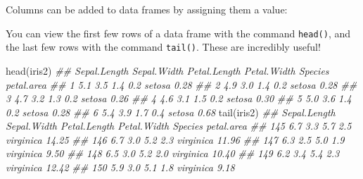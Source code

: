 \documentclass[
  13,
  letterpaper,
]{report}
\newenvironment{Shaded}{\begin{snugshade}}{\end{snugshade}}
\newcommand{\CommentTok}[1]{\textcolor[rgb]{0.37,0.37,0.37}{#1}}
\newcommand{\DocumentationTok}[1]{\textcolor[rgb]{0.37,0.37,0.37}{\textit{#1}}}
\newcommand{\FunctionTok}[1]{\textcolor[rgb]{0.28,0.35,0.67}{#1}}
\newcommand{\NormalTok}[1]{\textcolor[rgb]{0.00,0.23,0.31}{#1}}
\newcommand{\OtherTok}[1]{\textcolor[rgb]{0.00,0.23,0.31}{#1}}
\newcommand{\SpecialCharTok}[1]{\textcolor[rgb]{0.37,0.37,0.37}{#1}}
\begin{document}
Columns can be added to data frames by assigning them a value:

\begin{Shaded}
\end{Shaded}

You can view the first few rows of a data frame with the command
\texttt{head()}, and the last few rows with the command \texttt{tail()}.
These are incredibly useful!

\begin{Shaded}
\begin{Highlighting}[]
\FunctionTok{head}\NormalTok{(iris2)}
\DocumentationTok{\#\#   Sepal.Length Sepal.Width Petal.Length Petal.Width Species petal.area}
\DocumentationTok{\#\# 1          5.1         3.5          1.4         0.2  setosa       0.28}
\DocumentationTok{\#\# 2          4.9         3.0          1.4         0.2  setosa       0.28}
\DocumentationTok{\#\# 3          4.7         3.2          1.3         0.2  setosa       0.26}
\DocumentationTok{\#\# 4          4.6         3.1          1.5         0.2  setosa       0.30}
\DocumentationTok{\#\# 5          5.0         3.6          1.4         0.2  setosa       0.28}
\DocumentationTok{\#\# 6          5.4         3.9          1.7         0.4  setosa       0.68}
\FunctionTok{tail}\NormalTok{(iris2)}
\DocumentationTok{\#\#     Sepal.Length Sepal.Width Petal.Length Petal.Width   Species petal.area}
\DocumentationTok{\#\# 145          6.7         3.3          5.7         2.5 virginica      14.25}
\DocumentationTok{\#\# 146          6.7         3.0          5.2         2.3 virginica      11.96}
\DocumentationTok{\#\# 147          6.3         2.5          5.0         1.9 virginica       9.50}
\DocumentationTok{\#\# 148          6.5         3.0          5.2         2.0 virginica      10.40}
\DocumentationTok{\#\# 149          6.2         3.4          5.4         2.3 virginica      12.42}
\DocumentationTok{\#\# 150          5.9         3.0          5.1         1.8 virginica       9.18}
\end{Highlighting}
\end{Shaded}
\end{document}
